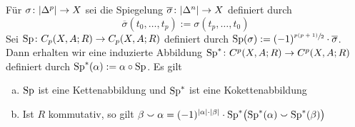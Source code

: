 \begin{lemma}[{name=[Spiegelung von singulären Simplizes]},label=spiegelung_simplex]
	Für $\sigma \colon \abs{\Delta^p} \to X$ sei die Spiegelung $\overline{\sigma} \colon \abs{\Delta^n} \to X$ definiert durch 
	\[
		\overline{\sigma}(t_0, \ldots , t_p ) :=  \sigma(t_p, \ldots ,t_0)
	\]
	Sei $\Sp \colon C_p(X,A;R) \to C_p(X,A;R)$ definiert durch $\Sp(\sigma) := (-1)^{\sfrac{p(p+1)}{2}} \cdot \overline{\sigma}$. 
	Dann erhalten wir eine induzierte Abbildung $\Sp^* \colon C^p(X,A;R) \to C^p(X,A;R)$ definiert durch $\Sp^*(\alpha) := \alpha \circ \Sp$. Es gilt
	\begin{enumerate}[a)]
		\item $\Sp$ ist eine Kettenabbildung und $\Sp^*$ ist eine Kokettenabbildung
		\item Ist $R$ kommutativ, so gilt $\beta \cupp \alpha = (-1)^{\abs*{\alpha} \cdot \abs*{\beta} }\cdot \Sp^*\enbrace[\big]{\Sp^*(\alpha) \cupp \Sp^*(\beta)}$
	\end{enumerate}
\end{lemma}
